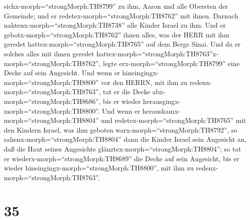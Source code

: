 sichx-morph=``strongMorph:TH8799'' zu ihm, Aaron und alle Obersten der
Gemeinde; und er redetex-morph=``strongMorph:TH8762'' mit ihnen.
 Darnach nahtenx-morph=``strongMorph:TH8738'' alle Kinder
Israel zu ihm. Und er gebotx-morph=``strongMorph:TH8762'' ihnen alles,
was der HERR mit ihm geredet hattex-morph=``strongMorph:TH8765'' auf dem
Berge Sinai.  Und da er solches alles mit ihnen geredet
hattex-morph=``strongMorph:TH8763''x-morph=``strongMorph:TH8762'', legte
erx-morph=``strongMorph:TH8799'' eine Decke auf sein Angesicht.
 Und wenn er hineingingx-morph=``strongMorph:TH8800'' vor
den HERRN, mit ihm zu redenx-morph=``strongMorph:TH8763'', tat er die
Decke abx-morph=``strongMorph:TH8686'', bis er wieder
herausgingx-morph=``strongMorph:TH8800''. Und wenn er
herauskamx-morph=``strongMorph:TH8804'' und
redetex-morph=``strongMorph:TH8765'' mit den Kindern Israel, was ihm
geboten warx-morph=``strongMorph:TH8792'',  so
sahenx-morph=``strongMorph:TH8804'' dann die Kinder Israel sein
Angesicht an, daß die Haut seines Angesichts
glänztex-morph=``strongMorph:TH8804''; so tat er
wiederx-morph=``strongMorph:TH8689'' die Decke auf sein Angesicht, bis
er wieder hineingingx-morph=``strongMorph:TH8800'', mit ihm zu
redenx-morph=``strongMorph:TH8763''.

\hypertarget{section-34}{%
\section{35}\label{section-34}}

